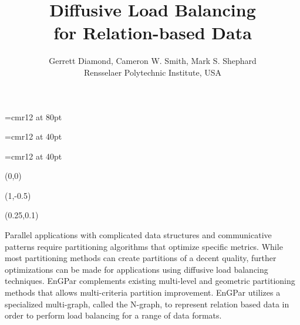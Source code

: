 \documentclass{beamer}
\begin{document}
\font\titlefont=cmr12 at 80pt
\title[]
{\titlefont
Diffusive Load Balancing \\for Relation-based Data
}
\font\authorfont=cmr12 at 40pt
\author[]{\authorfont
  Gerrett Diamond, Cameron W. Smith, Mark S. Shephard\\
  Rensselaer Polytechnic Institute, USA}
\date{}
\font\abstractfont=cmr12 at 40pt
\begin{textblock}{15.8}(0,0)
  \titlepage
  \begin{textblock}{14}(1,-0.5)
    \begin{block}{}
      \begin{textblock}{13.5}(0.25,0.1)
      \begin{center}
        \abstractfont
      Parallel applications with complicated data structures and communicative patterns
      require partitioning algorithms that optimize specific metrics. While most
      partitioning methods can create partitions of a decent quality, further
      optimizations can be made for applications using diffusive load balancing techniques.
      EnGPar complements existing multi-level and geometric partitioning methods that allows
      multi-criteria partition improvement. EnGPar utilizes a specialized multi-graph, called
      the N-graph, to represent relation based data in order to perform load balancing for a
      range of data formats.
      \end{center}
      \end{textblock}
      \vspace{6.5cm}
    \end{block}
  \end{textblock}
\end{textblock}
\end{document}
